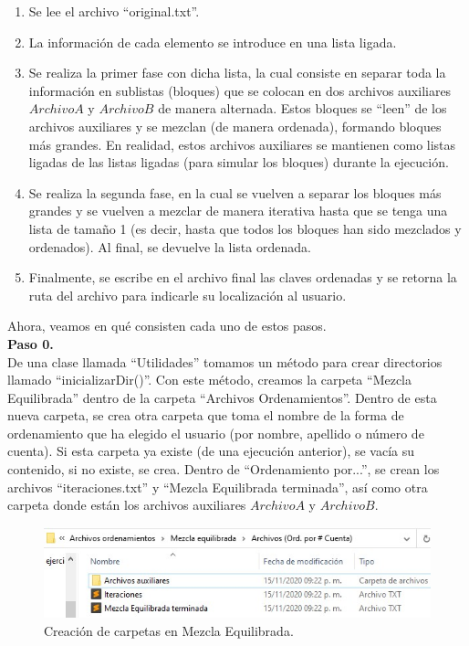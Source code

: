 \documentclass[12pt, letterpaper]{report}
\begin{document}
        \begin{enumerate}
        
            \item Se lee el archivo ``original.txt''. 
            \item La información de cada elemento se introduce en una lista ligada.
            \item Se realiza la primer fase con dicha lista, la cual consiste en separar toda la información en sublistas (bloques) que se colocan en dos archivos auxiliares $Archivo A$ y $Archivo B$ de manera alternada. Estos bloques se ``leen'' de los archivos auxiliares y se mezclan (de manera ordenada), formando bloques más grandes. En realidad, estos archivos auxiliares se mantienen como listas ligadas de las listas ligadas (para simular los bloques) durante la ejecución.
            \item Se realiza la segunda fase, en la cual se vuelven a separar los bloques más grandes y se vuelven a mezclar de manera iterativa hasta que se tenga una lista de tamaño 1 (es decir, hasta que todos los bloques han sido mezclados y ordenados). Al final, se devuelve la lista ordenada.
            \item Finalmente, se escribe en el archivo final las claves ordenadas y se retorna la ruta del archivo para indicarle su localización al usuario.
            
        \end{enumerate}
    
    Ahora, veamos en qué consisten cada uno de estos pasos. \\
    
     \textbf{Paso 0.}\\
    De una clase llamada ``Utilidades'' tomamos un método para crear directorios llamado ``inicializarDir()''. Con este método, creamos la carpeta ``Mezcla Equilibrada'' dentro de la carpeta ``Archivos Ordenamientos''. Dentro de esta nueva carpeta, se crea otra carpeta que toma el nombre de la forma de ordenamiento que ha elegido el usuario (por nombre, apellido o número de cuenta). Si esta carpeta ya existe (de una ejecución anterior), se vacía su contenido, si no existe, se crea. Dentro de ``Ordenamiento por...'', se crean los archivos ``iteraciones.txt'' y ``Mezcla Equilibrada terminada'', así como otra carpeta donde están los archivos auxiliares $ArchivoA$ y $ArchivoB$.\\
    
    \begin{figure}[h!]
		\begin{center}
			\includegraphics[scale=1]{D1.jpg}
			\caption{Creación de carpetas en Mezcla Equilibrada.}
		\end{center}
	\end{figure}
    
\end{document}
